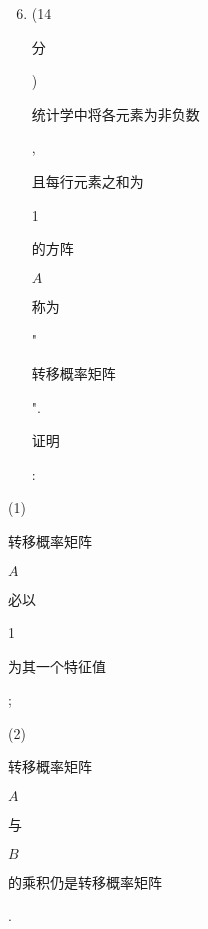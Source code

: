 \documentclass[10pt]{article}
\begin{document}
\begin{enumerate}
  \setcounter{enumi}{5}
  \item (14 \begin{CJK}{UTF8}{mj}分\end{CJK}) \begin{CJK}{UTF8}{mj}统计学中将各元素为非负数\end{CJK}, \begin{CJK}{UTF8}{mj}且每行元素之和为\end{CJK} 1 \begin{CJK}{UTF8}{mj}的方阵\end{CJK} $A$ \begin{CJK}{UTF8}{mj}称为\end{CJK}"\begin{CJK}{UTF8}{mj}转移概率矩阵\end{CJK}". \begin{CJK}{UTF8}{mj}证明\end{CJK}:
\end{enumerate}
(1) \begin{CJK}{UTF8}{mj}转移概率矩阵\end{CJK} $A$ \begin{CJK}{UTF8}{mj}必以\end{CJK} 1 \begin{CJK}{UTF8}{mj}为其一个特征值\end{CJK};

(2) \begin{CJK}{UTF8}{mj}转移概率矩阵\end{CJK} $A$ \begin{CJK}{UTF8}{mj}与\end{CJK} $B$ \begin{CJK}{UTF8}{mj}的乘积仍是转移概率矩阵\end{CJK}.
\end{document}
